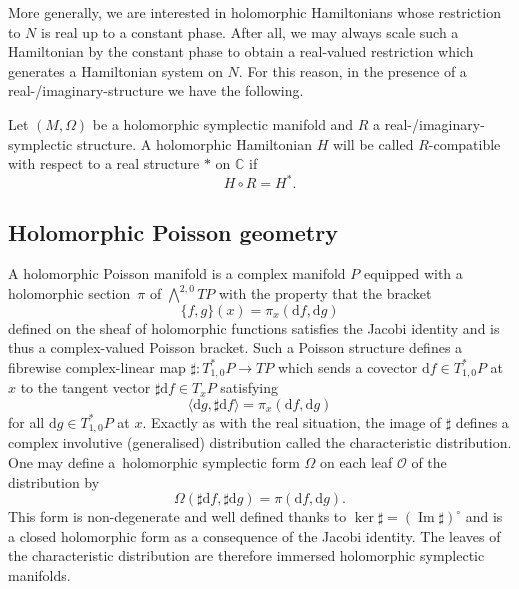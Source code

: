 \documentclass[pdftex]{sigma}
\numberwithin{equation}{section}
\DeclareMathOperator{\Imag}{Im}
\newcommand{\C}{\mathbb{C}}
\begin{document}
More generally, we are interested in holomorphic Hamiltonians whose restriction to $N$ is real up to a constant phase. After all, we may always scale such a Hamiltonian by the constant phase to obtain a real-valued restriction which generates a Hamiltonian system on $N$. For this reason, in the presence of a real-/imaginary-structure we have the following.

\begin{Definition}\label{compat_Ham}
	Let $(M,\Omega)$ be a holomorphic symplectic manifold and $R$ a real-/imaginary-symplectic structure. A holomorphic Hamiltonian $H$ will be called $R$-compatible with respect to a real structure $*$ on $\C$ if
	\begin{equation*}%
		H\circ R=H^*.
	\end{equation*}
\end{Definition}

\subsection{Holomorphic Poisson geometry}

A holomorphic Poisson manifold is a complex manifold $P$ equipped with a holomorphic section~$\pi$ of $\bigwedge^{2,0}TP$ with the property that the bracket
\[
\{f,g\}(x)=\pi_x(\mathrm{d}f,\mathrm{d}g)
\]
defined on the sheaf of holomorphic functions satisfies the Jacobi identity and is thus a com\-plex-valued Poisson bracket. Such a Poisson structure defines a fibrewise complex-linear map $\sharp\colon T^*_{1,0}P\rightarrow TP$ which sends a covector $\mathrm{d}f\in T^*_{1,0}P$ at $x$ to the tangent vector $\sharp \mathrm{d}f\in T_xP$ satisfying
\begin{equation}
	\label{sharpdefn}
	\langle \mathrm{d}g,\sharp \mathrm{d}f\rangle=\pi_x(\mathrm{d}f,\mathrm{d}g)
\end{equation}
for all $\mathrm{d}g\in T_{1,0}^*P$ at $x$. Exactly as with the real situation, the image of $\sharp$ defines a complex involutive (generalised) distribution called the characteristic distribution. One may define a~holomorphic symplectic form $\Omega$ on each leaf $\mathcal{O}$ of the distribution by
\begin{equation}\label{induced_symp_form}
	\Omega(\sharp \mathrm{d}f,\sharp \mathrm{d}g)=\pi(\mathrm{d}f,\mathrm{d}g).
\end{equation}
This form is non-degenerate and well defined thanks to $\ker\sharp=(\Imag\sharp)^\circ$ and is a closed holomorphic form as a consequence of the Jacobi identity. The leaves of the characteristic distribution are therefore immersed holomorphic symplectic manifolds.
\end{document}
